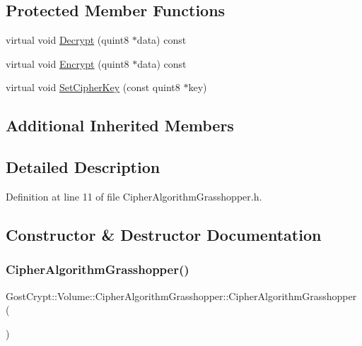\subsection*{Protected Member Functions}
\begin{DoxyCompactItemize}
\item 
virtual void \hyperlink{class_gost_crypt_1_1_volume_1_1_cipher_algorithm_grasshopper_aac197107282f4d3382961adb7130548e}{Decrypt} (quint8 $\ast$data) const
\item 
virtual void \hyperlink{class_gost_crypt_1_1_volume_1_1_cipher_algorithm_grasshopper_a51c5a99186cd497ccc3ac318018ffc89}{Encrypt} (quint8 $\ast$data) const
\item 
virtual void \hyperlink{class_gost_crypt_1_1_volume_1_1_cipher_algorithm_grasshopper_a32304b5f41ae22a3c461cd03a5b42041}{Set\+Cipher\+Key} (const quint8 $\ast$key)
\end{DoxyCompactItemize}
\subsection*{Additional Inherited Members}


\subsection{Detailed Description}


Definition at line 11 of file Cipher\+Algorithm\+Grasshopper.\+h.



\subsection{Constructor \& Destructor Documentation}
\mbox{\label{class_gost_crypt_1_1_volume_1_1_cipher_algorithm_grasshopper_a61607bd99abc6ad00cb4a92f73301aee}} 
\subsubsection{\texorpdfstring{Cipher\+Algorithm\+Grasshopper()}{CipherAlgorithmGrasshopper()}}
{\footnotesize\ttfamily Gost\+Crypt\+::\+Volume\+::\+Cipher\+Algorithm\+Grasshopper\+::\+Cipher\+Algorithm\+Grasshopper (\begin{DoxyParamCaption}{ }\end{DoxyParamCaption})\hspace{0.3cm}{\ttfamily [inline]}}




